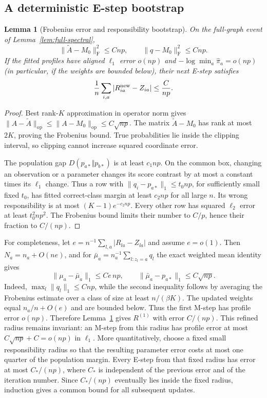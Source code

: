 \documentclass[11pt]{article}
\newtheorem{lemma}[theorem]{Lemma}
\theoremstyle{definition}
\theoremstyle{remark}
\numberwithin{equation}{section}
\begin{document}
\subsection{A deterministic E-step bootstrap}
\begin{lemma}[Frobenius error and responsibility bootstrap]\label{lem:bootstrap}
On the full-graph event of Lemma~\ref{lem:full-spectral},
\[
 \|\widetilde A-M_0\|_{\mathrm F}^2\le Cnp,\qquad \|q-M_0\|_{\mathrm F}^2\le Cnp.
\]
If the fitted profiles have aligned $\ell_1$ error $o(np)$ and $-\log\min_a\widehat\pi_a=o(np)$ (in particular, if the weights are bounded below), their next E-step satisfies
\[
 \frac1n\sum_{i,a}|R^{\rm new}_{ia}-Z_{ia}|\le \frac{C}{np}.
\]
\end{lemma}
\begin{proof}
Best rank-$K$ approximation in operator norm gives $\|A-\widetilde A\|_{\mathrm{op}}\le\|A-M_0\|_{\mathrm{op}}\le C\sqrt{np}$. The matrix $\widetilde A-M_0$ has rank at most $2K$, proving the Frobenius bound. True probabilities lie inside the clipping interval, so clipping cannot increase squared coordinate error.

The population gap $D(p_{a*}\Vert p_{b*})$ is at least $c_1np$. On the common box, changing an observation or a parameter changes its score contrast by at most a constant times its $\ell_1$ change. Thus a row with $\|q_i-p_{a*}\|_1\le t_0np$, for sufficiently small fixed $t_0$, has fitted correct-class margin at least $c_2np$ for all large $n$. Its wrong responsibility is at most $(K-1)e^{-c_2np}$. Every other row has squared $\ell_2$ error at least $t_0^2n p^2$. The Frobenius bound limits their number to $C/p$, hence their fraction to $C/(np)$.
\end{proof}

For completeness, let $e=n^{-1}\sum_{l,a}|R_{la}-Z_{la}|$ and assume $e=o(1)$. Then $N_a=n_a+O(ne)$, and for $\bar\mu_a=n_a^{-1}\sum_{l:z_l=a}q_l$ the exact weighted mean identity gives
\[
 \|\mu_a-\bar\mu_a\|_1\le Ce\,np,
 \qquad
 \|\bar\mu_a-p_{a*}\|_1\le C\sqrt{np}.
\]
Indeed, $\max_l\|q_l\|_1\le Cnp$, while the second inequality follows by averaging the Frobenius estimate over a class of size at least $n/(\beta K)$. The updated weights equal $n_a/n+O(e)$ and are bounded below. Thus the first M-step has profile error $o(np)$. Therefore Lemma~\ref{lem:bootstrap} gives $R^{(1)}$ with error $C/(np)$. This refined radius remains invariant: an M-step from this radius has profile error at most $C\sqrt{np}+C=o(np)$ in $\ell_1$. More quantitatively, choose a fixed small responsibility radius so that the resulting parameter error costs at most one quarter of the population margin. Every E-step from that fixed radius has error at most $C_*/(np)$, where $C_*$ is independent of the previous error and of the iteration number. Since $C_*/(np)$ eventually lies inside the fixed radius, induction gives a common bound for all subsequent updates.
\end{document}

